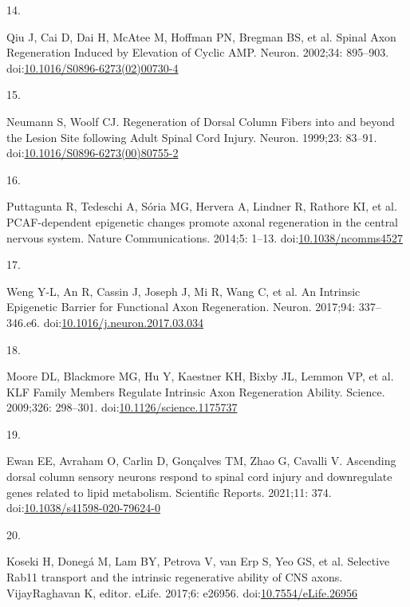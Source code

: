 \documentclass[
  12pt,
  a4paper,
]{book}
\newlength{\cslhangindent}
\newlength{\csllabelwidth}
\newlength{\cslentryspacingunit} %
\newenvironment{CSLReferences}[2] %
 {%
  \setlength{\parindent}{0pt}
  \ifodd #1
  \let\oldpar\par
  \def\par{\hangindent=\cslhangindent\oldpar}
  \fi
  \setlength{\parskip}{#2\cslentryspacingunit}
 }%
 {}
\newcommand{\CSLLeftMargin}[1]{\parbox[t]{\csllabelwidth}{#1}}
\newcommand{\CSLRightInline}[1]{\parbox[t]{\linewidth - \csllabelwidth}{#1}\break}
\begin{document}
\begin{CSLReferences}{0}{0}
\leavevmode{}%
\CSLLeftMargin{14. }%
\CSLRightInline{Qiu J, Cai D, Dai H, McAtee M, Hoffman PN, Bregman BS, et al. Spinal {Axon Regeneration Induced} by {Elevation} of {Cyclic AMP}. Neuron. 2002;34: 895--903. doi:\href{https://doi.org/10.1016/S0896-6273(02)00730-4}{10.1016/S0896-6273(02)00730-4}}

\leavevmode{}%
\CSLLeftMargin{15. }%
\CSLRightInline{Neumann S, Woolf CJ. Regeneration of {Dorsal Column Fibers} into and beyond the {Lesion Site} following {Adult Spinal Cord Injury}. Neuron. 1999;23: 83--91. doi:\href{https://doi.org/10.1016/S0896-6273(00)80755-2}{10.1016/S0896-6273(00)80755-2}}

\leavevmode{}%
\CSLLeftMargin{16. }%
\CSLRightInline{Puttagunta R, Tedeschi A, Sória MG, Hervera A, Lindner R, Rathore KI, et al. {PCAF-dependent} epigenetic changes promote axonal regeneration in the central nervous system. Nature Communications. 2014;5: 1--13. doi:\href{https://doi.org/10.1038/ncomms4527}{10.1038/ncomms4527}}

\leavevmode{}%
\CSLLeftMargin{17. }%
\CSLRightInline{Weng Y-L, An R, Cassin J, Joseph J, Mi R, Wang C, et al. An {Intrinsic Epigenetic Barrier} for {Functional Axon Regeneration}. Neuron. 2017;94: 337--346.e6. doi:\href{https://doi.org/10.1016/j.neuron.2017.03.034}{10.1016/j.neuron.2017.03.034}}

\leavevmode{}%
\CSLLeftMargin{18. }%
\CSLRightInline{Moore DL, Blackmore MG, Hu Y, Kaestner KH, Bixby JL, Lemmon VP, et al. {KLF Family Members Regulate Intrinsic Axon Regeneration Ability}. Science. 2009;326: 298--301. doi:\href{https://doi.org/10.1126/science.1175737}{10.1126/science.1175737}}

\leavevmode{}%
\CSLLeftMargin{19. }%
\CSLRightInline{Ewan EE, Avraham O, Carlin D, Gonçalves TM, Zhao G, Cavalli V. Ascending dorsal column sensory neurons respond to spinal cord injury and downregulate genes related to lipid metabolism. Scientific Reports. 2021;11: 374. doi:\href{https://doi.org/10.1038/s41598-020-79624-0}{10.1038/s41598-020-79624-0}}

\leavevmode{}%
\CSLLeftMargin{20. }%
\CSLRightInline{Koseki H, Donegá M, Lam BY, Petrova V, van Erp S, Yeo GS, et al. Selective Rab11 transport and the intrinsic regenerative ability of {CNS} axons. VijayRaghavan K, editor. eLife. 2017;6: e26956. doi:\href{https://doi.org/10.7554/eLife.26956}{10.7554/eLife.26956}}


\end{CSLReferences}
\end{document}
